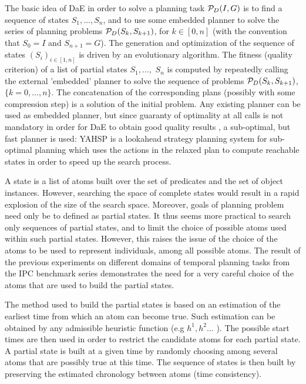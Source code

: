 \documentclass{MYsig-alternate}
\begin{document}
The basic idea of DaE in order to solve a planning task ${\cal P}_D(I,G)$ is to find a sequence of states $S_1, \ldots, S_n$, and to use some embedded planner to solve the series of planning problems ${\cal P}_D(S_{k},S_{k+1})$, for $k \in [0,n]$ (with the convention that $S_0 = I$ and $S_{n+1} = G$). The generation and optimization of the sequence of states $(S_i)_{i \in [1,n]}$ is driven by an evolutionary algorithm. 
The fitness (quality criterion) of a list of partial states $S_1, \ldots,$ $S_n$ is computed by repeatedly calling the external 'embedded' planner to solve the sequence of problems ${\cal P}_D(S_{k},S_{k+1})$, $\{k=0,\ldots,n\}$. The concatenation of the corresponding plans (possibly with some compression step) is a solution of the initial problem.
Any existing planner can be used as embedded planner, but since guaranty of optimality at all calls is not mandatory in order for DaE to obtain good quality results \cite{Bibai:ICAPS2010}, a sub-optimal, but fast planner is used: YAHSP \cite{V:icaps04} is a lookahead strategy planning system for sub-optimal planning which uses the  actions in the relaxed plan to compute reachable states in order to speed up the search process. 

A state is a list of atoms built over the set of predicates and the set of object instances. However, searching the space of complete states would result in a rapid explosion of the size of the search space. Moreover, goals of planning problem need only be to defined as partial states. It thus seems more practical to search only sequences of partial states, and to limit the choice of possible atoms used within such partial states. However, this raises the issue of the choice of the atoms to be used to represent individuals, among all possible atoms. The result of the previous experiments on different domains of temporal planning tasks from the IPC benchmark series \cite{BibEvoCop2009} demonstrates the need for a very careful choice of the atoms that are used to build the partial states. 

The method used to build the partial states is based on an estimation of the earliest time from which an atom can become true. Such estimation can be obtained by any admissible heuristic function (e.g $h^1,h^2...$ \cite{HaslumGeffner-AIPS-2000}). The possible start times are then used in order to restrict the candidate atoms for each partial state. A partial state is built at a given time by randomly choosing among several atoms that are possibly true at this time. The sequence of states is then built by preserving the estimated chronology between atoms (time consistency).
\end{document}
